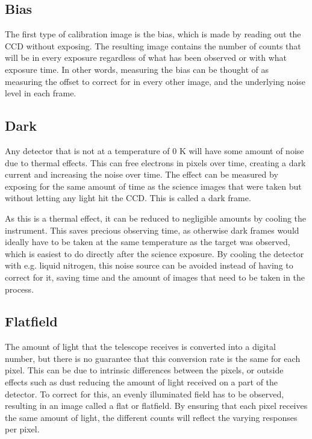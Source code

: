 \documentclass[a4paper,oneside,12pt, class=Latex/Classes/PhDthesisPSnPDF, crop=false]{standalone}
\begin{document}
\subsection{Bias}
The first type of calibration image is the bias, which is made by reading out the CCD without exposing. The resulting image contains the number of counts that will be in every exposure regardless of what has been observed or with what exposure time. In other words, measuring the bias can be thought of as measuring the offset to correct for in every other image, and the underlying noise level in each frame.


\subsection{Dark}
Any detector that is not at a temperature of 0 K will have some amount of noise due to thermal effects. This can free electrons in pixels over time, creating a dark current and increasing the noise over time. The effect can be measured by exposing for the same amount of time as the science images that were taken but without letting any light hit the CCD. This is called a dark frame.

As this is a thermal effect, it can be reduced to negligible amounts by cooling the instrument. This saves precious observing time, as otherwise dark frames would ideally have to be taken at the same temperature as the target was observed, which is easiest to do directly after the science exposure. By cooling the detector with e.g. liquid nitrogen, this noise source can be avoided instead of having to correct for it, saving time and the amount of images that need to be taken in the process.


\subsection{Flatfield}
The amount of light that the telescope receives is converted into a digital number, but there is no guarantee that this conversion rate is the same for each pixel. This can be due to intrinsic differences between the pixels, or outside effects such as dust reducing the amount of light received on a part of the detector. To correct for this, an evenly illuminated field has to be observed, resulting in an image called a flat or flatfield. By ensuring that each pixel receives the same amount of light, the different counts will reflect the varying responses per pixel.
\end{document}
